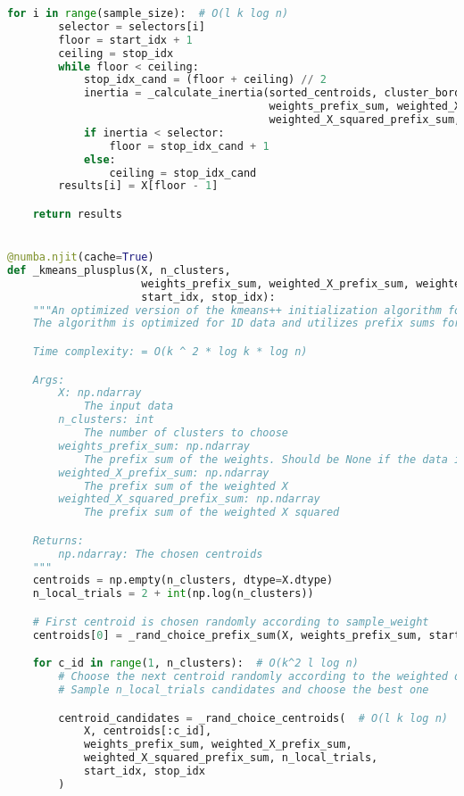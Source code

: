 \begin{lstlisting}[language=Python]
    for i in range(sample_size):  # O(l k log n)
        selector = selectors[i]
        floor = start_idx + 1
        ceiling = stop_idx
        while floor < ceiling:
            stop_idx_cand = (floor + ceiling) // 2
            inertia = _calculate_inertia(sorted_centroids, cluster_borders,  # O(k)
                                         weights_prefix_sum, weighted_X_prefix_sum,
                                         weighted_X_squared_prefix_sum, stop_idx_cand)
            if inertia < selector:
                floor = stop_idx_cand + 1
            else:
                ceiling = stop_idx_cand
        results[i] = X[floor - 1]

    return results


@numba.njit(cache=True)
def _kmeans_plusplus(X, n_clusters,
                     weights_prefix_sum, weighted_X_prefix_sum, weighted_X_squared_prefix_sum,
                     start_idx, stop_idx):
    """An optimized version of the kmeans++ initialization algorithm for 1D data.
    The algorithm is optimized for 1D data and utilizes prefix sums for efficient calculations.

    Time complexity: = O(k ^ 2 * log k * log n)

    Args:
        X: np.ndarray
            The input data
        n_clusters: int
            The number of clusters to choose
        weights_prefix_sum: np.ndarray
            The prefix sum of the weights. Should be None if the data is unweighted.
        weighted_X_prefix_sum: np.ndarray
            The prefix sum of the weighted X
        weighted_X_squared_prefix_sum: np.ndarray
            The prefix sum of the weighted X squared

    Returns:
        np.ndarray: The chosen centroids
    """
    centroids = np.empty(n_clusters, dtype=X.dtype)
    n_local_trials = 2 + int(np.log(n_clusters))

    # First centroid is chosen randomly according to sample_weight
    centroids[0] = _rand_choice_prefix_sum(X, weights_prefix_sum, start_idx, stop_idx)  # O(log n)

    for c_id in range(1, n_clusters):  # O(k^2 l log n)
        # Choose the next centroid randomly according to the weighted distances
        # Sample n_local_trials candidates and choose the best one

        centroid_candidates = _rand_choice_centroids(  # O(l k log n)
            X, centroids[:c_id],
            weights_prefix_sum, weighted_X_prefix_sum,
            weighted_X_squared_prefix_sum, n_local_trials,
            start_idx, stop_idx
        )


\end{lstlisting}
